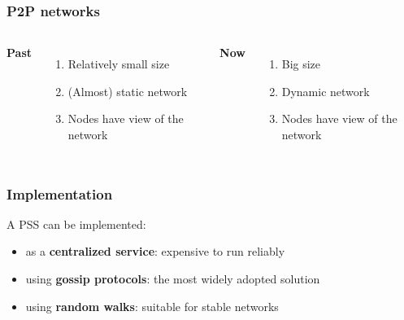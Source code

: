 \documentclass{beamer}
\begin{document}
\begin{frame}
\frametitle{P2P networks}
\begin{columns}[t] %

\textbf{Past}
\begin{enumerate}
\item Relatively small size
\item (Almost) static network
\item Nodes have {\color{red}{full}} view of the network
\end{enumerate}

\textbf{Now}
\begin{enumerate}
\item Big size
\item Dynamic network
\item Nodes have {\color{red}{partial}} view of the network
\end{enumerate}
\end{columns}
\end{frame}


\begin{frame}
\frametitle{Implementation}
A PSS can be implemented:
\begin{itemize}
	\item as a \textbf{centralized service}: expensive to run reliably
	\item using \textbf{gossip protocols}: the most widely adopted solution
	\item using \textbf{random walks}: suitable for stable networks
\end{itemize}
\end{frame}
\end{document}
